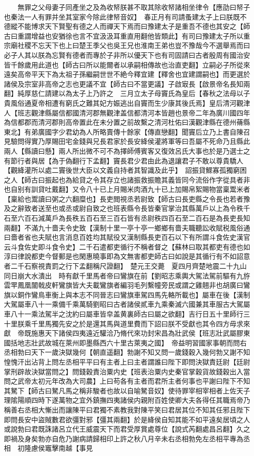 　　無罪之父母妻子同產坐之及為收帑朕甚不取其除收帑諸相坐律令【應劭曰帑子也秦法一人有罪并坐其室家今除此律帑音奴】　春正月有司請蚤建太子上曰朕既不德縱不能博求天下賢聖有德之人而禪天下焉而曰豫建太子是重吾不德也其安之【師古曰重謂增益也安猶徐也言不宜汲汲耳重直用翻他皆類此】有司曰豫建太子所以重宗廟社稷不忘天下也上曰楚王季父也吳王兄也淮南王弟也豈不豫哉今不選舉焉而曰必子人其以朕為忘賢有德者而專於子非所以優天下也有司固請曰古者殷周有國治安皆千餘歲用此道也【師古曰所以能爾者以承嗣相傳故也治直吏翻】立嗣必子所從來遠矣高帝平天下為太祖子孫繼嗣世世不絶今釋宜建【釋舍也宜建謂嗣也】而更選於諸侯及宗室非高帝之志也更議不宜【師古曰不當更議】子啟㝡長【啟景帝名長知兩翻】純厚慈仁請建以為太子上乃許之　三月立太子母竇氏為皇后【春秋之法母以子貴風俗通夏帝相遭有窮氏之難其妃方娠逃出自竇而生少康其後氏焉】皇后清河觀津人【班志觀津縣屬信都國清河郡無觀津盖信都清河本皆趙也景帝二年為廣川國四年為信都郡而清河郡則高帝置此在未分置之前故繫之清河杜佑曰漢觀津縣在德州蓨縣東北】有弟廣國字少君幼為人所略賣傳十餘家【傳直戀翻】聞竇后立乃上書自陳召見驗問得實乃厚賜田宅金錢與兄長君家於長安絳侯灌將軍等曰吾屬不死命乃且縣此兩人【縣讀曰懸】兩人所出微不可不為擇師傅賓客又復效呂氏大事也於是乃選士之有節行者與居【為于偽翻行下孟翻】竇長君少君由此為退讓君子不敢以尊貴驕人【觀絳灌所以處二竇後世大臣以文義自持者其智識及此乎】　詔振貸鰥寡孤獨窮困之人【師古曰振起也為給貸之令其存立也諸振救振贍其義皆同今流俗作字從具者非也自别有訓貸吐戴翻】又令八十已上月賜米肉酒九十已上加賜帛絮賜物當稟鬻米者【稟給也鬻讀曰粥之六翻糜也】長吏閲視丞若尉致【師古曰長吏縣之令長也若者豫及之辭致者送至也或丞或尉自致之也班表縣令長皆秦官掌治其縣萬戶以上為令秩千石至六百石減萬戶為長秩五百石至三百石皆有丞尉秩四百石至二百石是為長吏長知兩翻】不滿九十嗇夫令史致【漢制十里一亭十亭一鄉鄉有嗇夫職聽訟收賦税風俗通曰嗇者省也夫賦也言消息百姓均其賦役又漢制縣長吏百石以下有所謂斗食佐史漢官云斗食佐史即斗食令史】二千石遣都吏循行不稱者督之【蘇林曰取其都吏有德也如淳曰律說都吏今督郵是也閑惠曉事即為文無害都吏師古曰如說是其循行有不如詔意者二千石察視責罰之行下孟翻稱尺證翻】　楚元王交薨　夏四月齊楚地震二十九山同日崩大水潰出　時有獻千里馬者帝曰鸞旗在前【劉昭志乘輿大駕法駕前驅有九斿雲䍐鳳凰闟戟皮軒鸞旗皆大夫載鸞旗者編羽毛列繫幢旁民或謂之雞翹非也胡廣曰鸞旗以銅作鸞鳥車衡上與本志不同晉志曰鸞旗車駕四馬先輅所載也】屬車在後【漢制大駕屬車八十一乘備千乘萬騎劉昭曰古者諸侯貳車九乘秦滅六國兼其車服古大駕屬車八十一乘法駕半之沈約曰屬車皆皁盖黄裏師古曰屬之欲翻】吉行日五十里師行三十里朕乘千里馬獨先安之於是還其馬與道里費而下詔曰朕不受獻也其令四方毋求來獻　帝既施惠天下諸侯四夷遠近驩洽乃脩代來功封宋昌為壯武侯【班志壯武屬膠東國括地志壯武故城在萊州即墨縣西六十里古萊夷之國】　帝益明習國家事朝而問右丞相勃曰天下一歲決獄幾何【朝直遥翻】勃謝不知又問一歲錢穀入幾何勃又謝不知惶愧汗出沾背上問左丞相平平曰有主者上曰主者謂誰曰陛下即問決獄責廷尉【廷尉掌刑辟故決獄當問之】問錢穀責治粟内史【班表治粟内史秦官掌穀貨故錢穀出入當問之武帝太初元年改為大司農】上曰苟各有主者而君所主者何事也平謝曰陛下不知其駑下【師古曰駑凡馬之稱非駿者也故以自喻駑音奴】使待罪宰相宰相者上佐天子理隂陽順四時下遂萬物之宜外鎮撫四夷諸侯内親附百姓使卿大夫各得任其職焉帝乃稱善右丞相大慚出而讓陳平曰君獨不素教我對陳平笑曰君居其位不知其任邪且陛下即問長安中盜賊數君欲彊對邪【彊其兩翻】於是絳侯自知其能不如平遠矣居頃之人或說勃曰君既誅諸呂立代王威震天下而君受厚賞處尊位【說式芮翻處昌呂翻】久之即禍及身矣勃亦自危乃謝病請歸相印上許之秋八月辛未右丞相勃免左丞相平專為丞相　初隆慮侯竈擊南越【事見